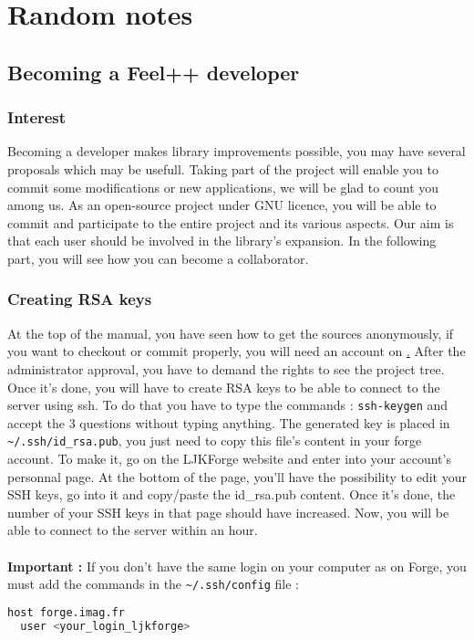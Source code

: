 \chapter{Random notes}
\label{cha:random-notes}

\section{Becoming a Feel++ developer}
\label{feeldevel}
\subsection{Interest}
Becoming a \feel developer makes library improvements possible, you may have several proposals which may be usefull. Taking part of the project will enable you to commit some modifications or new applications, we will be glad to count you among us. As an open-source project under GNU licence,  you will be able to commit and participate to the entire project and its various aspects. Our aim is that each user should be involved in the library's expansion. In the following part, you will see how you can become a \feel collaborator.

\subsection{Creating RSA keys}
\label{sec:creation-rsa-keys}
At the top of the manual, you have seen how to get the sources anonymously, if you want to checkout or commit properly, you will need an account on \href{https://forge.imag.fr/}. After the administrator approval, you have to demand the rights to see the project tree. \newline \newline
Once it's done, you will have to create RSA keys to be able to connect to the server using ssh. To do that you have to type the commands : \verb|ssh-keygen| and accept the 3 questions without typing anything. The generated key is placed in \verb|~/.ssh/id_rsa.pub|, you just need to copy this file's content in your forge account. To make it, go on the LJKForge website and enter into your account's personnal page. At the bottom of the page, you'll have the possibility to edit your SSH keys, go into it and copy/paste the id\_rsa.pub content. Once it's done, the number of your SSH keys in that page should have increased. Now, you will be able to connect to the server within an hour.
\\ \\
{\bfseries Important : } If you don't have the same login on your computer as on
Forge, you must add the commands in the \verb|~/.ssh/config| file :
\begin{lstlisting}[language=sh]
host forge.imag.fr
  user <your_login_ljkforge>
\end{lstlisting}


